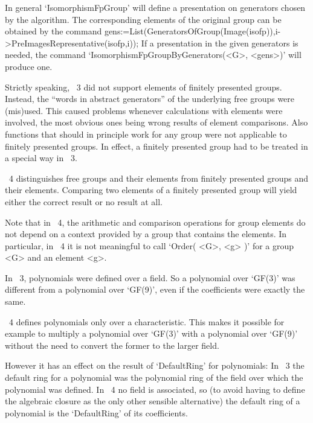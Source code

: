 In general `IsomorphismFpGroup' will define a presentation on generators
chosen by the algorithm. The corresponding elements of the original
group can be obtained by the command
\begintt
gens:=List(GeneratorsOfGroup(Image(isofp)),i->PreImagesRepresentative(isofp,i));
\endtt
If a presentation in the given generators is needed, the command
`IsomorphismFpGroupByGenerators(<G>, <gens>)' will produce one.



Strictly speaking, {\GAP}~3 did not support elements of finitely
presented groups.  Instead, the ``words in abstract generators'' of
the underlying free groups were (mis)used.  This caused problems
whenever calculations with elements were involved, the most obvious
ones being wrong results of element comparisons.  Also functions
that should in principle work for any group were not applicable to
finitely presented groups.  In effect, a finitely presented group had
to be treated in a special way in {\GAP}~3.

{\GAP}~4 distinguishes free groups and their elements from finitely
presented groups and their elements.  Comparing two elements of a
finitely presented group will yield either the correct result or no
result at all.

Note that in {\GAP}~4, the arithmetic and comparison operations for
group elements do not depend on a context provided by a group that
contains the elements.  In particular, in {\GAP}~4 it is not
meaningful to call `Order( <G>, <g> )' for a group <G> and an element
<g>.


In {\GAP}~3, polynomials were defined over a field. So a polynomial over
`GF(3)' was different from a polynomial over `GF(9)', even if the
coefficients were exactly the same.

{\GAP}~4 defines polynomials only over a characteristic. This makes it
possible for example to multiply a polynomial over `GF(3)' with a polynomial
over `GF(9)' without the need to convert the former to the larger field.

However it has an effect on the result of `DefaultRing' for polynomials:
In {\GAP}~3 the default ring for a polynomial was the polynomial ring of the
field over which the polynomial was defined. In {\GAP}~4 no field is
associated, so (to avoid having to define the algebraic closure as the only
other sensible alternative) the default ring of a polynomial is the
`DefaultRing' of its coefficients.


